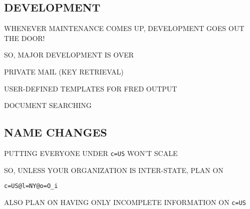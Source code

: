 \begin{bwslide}
\part*	{DEVELOPMENT}\bf

\begin{nrtc}
\item	WHENEVER MAINTENANCE COMES UP, DEVELOPMENT GOES OUT THE DOOR!

\item	SO, MAJOR DEVELOPMENT IS OVER
\end{nrtc}
\end{bwslide}


\begin{bwslide}

\begin{nrtc}
\item	PRIVATE MAIL (KEY RETRIEVAL)

\item	USER-DEFINED TEMPLATES FOR FRED OUTPUT

\item	DOCUMENT SEARCHING
\end{nrtc}
\end{bwslide}


\begin{bwslide}
\part*	{NAME CHANGES}\bf

\begin{nrtc}
\item	PUTTING EVERYONE UNDER \verb"c=US" WON'T SCALE

\item	SO, UNLESS YOUR ORGANIZATION IS INTER-STATE, PLAN ON
    \begin{nrtc}
    \item	\verb"c=US@l=NY@o=O_i"
    \end{nrtc}

\item	ALSO PLAN ON HAVING ONLY INCOMPLETE INFORMATION ON \verb"c=US"
\end{nrtc}
\end{bwslide}



